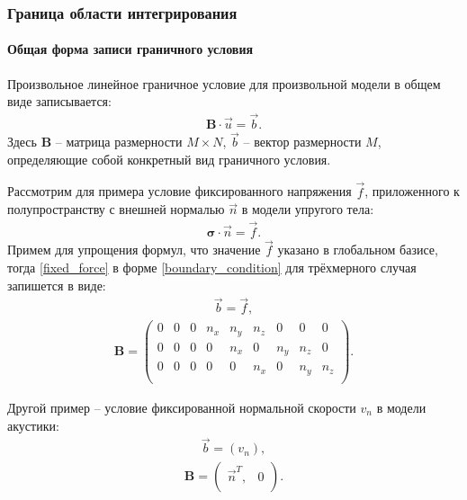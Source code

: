 \subsubsection{Граница области интегрирования}
\paragraph{Общая форма записи граничного условия}
Произвольное линейное граничное условие для произвольной модели 
в общем виде записывается:
\begin{eqnarray}
\label{boundary_condition}
	\mathbf{B} \cdot \vec{u} = \vec{b}.
\end{eqnarray}
Здесь $\mathbf{B}$ -- матрица размерности $M \times N$, $\vec{b}$ -- вектор размерности $M$, 
определяющие собой конкретный вид граничного условия.

Рассмотрим для примера условие фиксированного напряжения $\vec{f}$, 
приложенного к полупространству с внешней нормалью $\vec{n}$ в модели упругого тела:
\begin{eqnarray}
\label{fixed_force}
	\mathbf{\sigma} \cdot \vec{n} = \vec{f}.
\end{eqnarray}
Примем для упрощения формул, что значение $\vec{f}$ указано в глобальном базисе,
тогда \eqref{fixed_force} в форме \eqref{boundary_condition} 
для трёхмерного случая запишется в виде: 
\begin{eqnarray}
	\vec{b} = \vec{f},
\end{eqnarray}
\begin{align}
\label{fixed_force_global_basis_3D}
	\mathbf{B} =
	\left( \begin{array}{cccccccccccc}
	 0 & 0 & 0 & n_x & n_y & n_z & 0 & 0 & 0 \\
	 0 & 0 & 0 & 0 & n_x & 0 & n_y & n_z & 0 \\
	 0 & 0 & 0 & 0 & 0 & n_x & 0 & n_y & n_z \\
	\end{array} \right).
\end{align}

Другой пример -- условие фиксированной нормальной скорости $v_n$ в модели акустики:
\begin{eqnarray}
	\vec{b} = (v_n),
\end{eqnarray}
\begin{align}
\label{fixed_normal_velocity_acoustic}
	\mathbf{B} =
	\left( \begin{array}{cccccccccccc}
	 \vec{n}^T, & 0 \\
	\end{array} \right).
\end{align}

